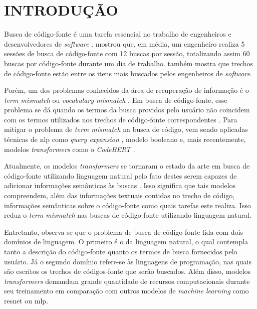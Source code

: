 \chapter{INTRODUÇÃO}
\label{chp:introduction}


Busca de código-fonte é uma tarefa essencial no trabalho de engenheiros e desenvolvedores de \textit{software} \cite{Rahman2018EvaluatingHD}. \textcite{Sadowski2015HowDS} mostrou que, em média, um engenheiro realiza 5 sessões de busca de código-fonte com 12 buscas por sessão, totalizando assim 60 buscas por código-fonte durante um dia de trabalho. \textcite{Xia2017WhatDD} também mostra que trechos de código-fonte estão entre os itens mais buscados pelos engenheiros de \textit{software}.

Porém, um dos problemas conhecidos da área de recuperação de informação é o \textit{term mismatch} ou \textit{vocabulary mismatch} \cite{Furnas1987TheVP} \cite{Carpineto2012ASO}. Em busca de código-fonte, esse problema se dá quando os termos da busca providos pelo usuário não coincidem com os termos utilizados nos trechos de código-fonte correspondentes \cite{Nie2016QueryEB}. Para mitigar o problema de \textit{term mismatch} na busca de código, vem sendo aplicadas técnicas de \gls{nlp} como \textit{query expansion} \cite{Nie2016QueryEB}, modelo booleano \cite{lv2015codehow} e, mais recentemente, modelos \textit{transformers} como o \textit{CodeBERT} \cite{Feng2020CodeBERTAP}.

Atualmente, os modelos \textit{transformers} se tornaram o estado da arte em busca de código-fonte utilizando linguagem natural pelo fato destes serem capazes de adicionar informações semânticas às buscas \cite{Guo2021GraphCodeBERTPC}. Isso significa que tais modelos compreendem, além das informações textuais contidas no trecho de código, informações semânticas sobre o código-fonte como quais tarefas este realiza. Isso reduz o \textit{term mismatch} nas buscas de código-fonte utilizando linguagem natural.

Entretanto, observa-se que o problema de busca de código-fonte lida com dois domínios de linguagem. O primeiro é o da linguagem natural, o qual contempla tanto a descrição do código-fonte quanto os termos de busca fornecidos pelo usuário. Já o segundo domínio refere-se às linguagens de programação, nas quais são escritos os trechos de códigos-fonte que serão buscados. Além disso, modelos \textit{transformers} demandam grande quantidade de recursos computacionais durante seu treinamento em comparação com outros modelos de \textit{machine learning} como \gls{resnet} ou \gls{mlp}.

